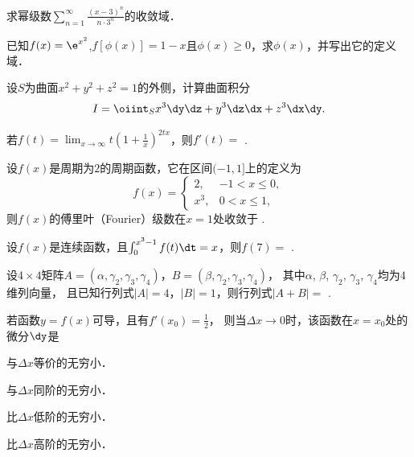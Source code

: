 \documentclass[plain,noanswer,medmath]{../../template/jnuexam}
\begin{document}




\begin{problem}
求幂级数$\sum_{n=1}^{\infty}\frac{(x-3)^n}{n\cdot 3^n}$的收敛域．
\end{problem}


\begin{problem}
已知$f(x)=\e^{x^2}$,$f[\phi(x)]=1-x$且$\phi(x)\ge 0$，求$\phi(x)$，并写出它的定义域．
\end{problem}


\begin{problem}
设$S$为曲面$x^2+y^2+z^2=1$的外侧，计算曲面积分
$$I=\oiint_S x^3\dy\dz + y^3\dz\dx + z^3\dx\dy.$$
\end{problem}




\begin{problem}
若$f(t)=\lim_{x\to\infty}t\left(1+\frac{1}{x}\right)^{2tx}$，则$f'(t)=$ \fillin{}.
\end{problem}


\begin{problem}
设$f(x)$是周期为$2$的周期函数，它在区间$(-1,1]$上的定义为
$$f(x)=\begin{cases}
    2, & -1<x\le 0, \\
  x^3, & 0<x\le 1,
\end{cases}$$
则$f(x)$的傅里叶（Fourier）级数在$x=1$处收敛于 \fillin{}.
\end{problem}


\begin{problem}
设$f(x)$是连续函数，且$\int_0^{x^3-1}f(t)\dt=x$，则$f(7)=$ \fillin{}.
\end{problem}


\begin{problem}
设$4\times 4$矩阵$A=(\alpha ,\gamma_2,\gamma_3,\gamma_4)$，$B=(\beta ,\gamma_2,\gamma_3,\gamma_4)$，
其中$\alpha$, $\beta$, $\gamma_2$, $\gamma_3$, $\gamma_4$均为$4$维列向量，
且已知行列式$|A|=4$，$|B|=1$，则行列式$|A+B|=$ \fillin{}.
\end{problem}




\begin{problem}
若函数$y=f(x)$可导，且有$f'(x_0)=\frac{1}{2}$，
则当$\Delta x\to 0$时，该函数在$x= x_0$处的微分$\dy$是 \pickout{}
\begin{abcd}
\item 与$\Delta x$等价的无穷小．
\item 与$\Delta x$同阶的无穷小．
\item 比$\Delta x$低阶的无穷小． 
\item 比$\Delta x$高阶的无穷小．
\end{abcd}
\end{problem}
\end{document}
